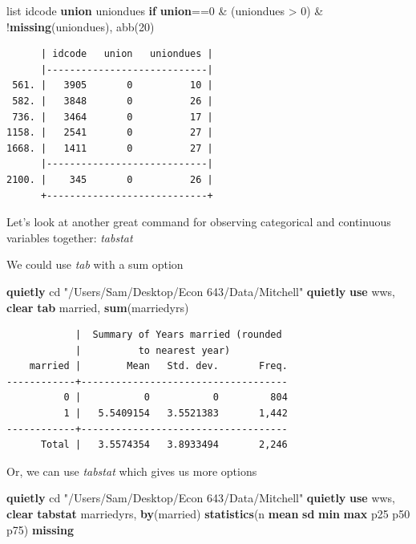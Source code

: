 \documentclass[
]{book}
\newenvironment{Shaded}{\begin{snugshade}}{\end{snugshade}}
\newcommand{\FunctionTok}[1]{\textcolor[rgb]{0.13,0.29,0.53}{\textbf{#1}}}
\newcommand{\KeywordTok}[1]{\textcolor[rgb]{0.13,0.29,0.53}{\textbf{#1}}}
\newcommand{\NormalTok}[1]{#1}
\newcommand{\OtherTok}[1]{\textcolor[rgb]{0.56,0.35,0.01}{#1}}
\newcommand{\StringTok}[1]{\textcolor[rgb]{0.31,0.60,0.02}{#1}}
\begin{document}
\begin{Shaded}
\begin{Highlighting}[]
\OtherTok{list}\NormalTok{ idcode }\KeywordTok{union}\NormalTok{ uniondues }\KeywordTok{if} \KeywordTok{union}\NormalTok{==0 \& (uniondues \textgreater{} 0) \& !}\FunctionTok{missing}\NormalTok{(uniondues), abb(20)}
\end{Highlighting}
\end{Shaded}

\begin{verbatim}
      | idcode   union   uniondues |
      |----------------------------|
 561. |   3905       0          10 |
 582. |   3848       0          26 |
 736. |   3464       0          17 |
1158. |   2541       0          27 |
1668. |   1411       0          27 |
      |----------------------------|
2100. |    345       0          26 |
      +----------------------------+
\end{verbatim}

Let's look at another great command for observing categorical and continuous
variables together: \emph{tabstat}

We could use \emph{tab} with a sum option

\begin{Shaded}
\begin{Highlighting}[]
\KeywordTok{quietly}\NormalTok{ cd }\StringTok{"/Users/Sam/Desktop/Econ 643/Data/Mitchell"}
\KeywordTok{quietly} \KeywordTok{use}\NormalTok{ wws, }\KeywordTok{clear}
\KeywordTok{tab}\NormalTok{ married, }\KeywordTok{sum}\NormalTok{(marriedyrs)}
\end{Highlighting}
\end{Shaded}

\begin{verbatim}
            |  Summary of Years married (rounded
            |          to nearest year)
    married |        Mean   Std. dev.       Freq.
------------+------------------------------------
          0 |           0           0         804
          1 |   5.5409154   3.5521383       1,442
------------+------------------------------------
      Total |   3.5574354   3.8933494       2,246
\end{verbatim}

Or, we can use \emph{tabstat} which gives us more options

\begin{Shaded}
\begin{Highlighting}[]
\KeywordTok{quietly}\NormalTok{ cd }\StringTok{"/Users/Sam/Desktop/Econ 643/Data/Mitchell"}
\KeywordTok{quietly} \KeywordTok{use}\NormalTok{ wws, }\KeywordTok{clear}
\KeywordTok{tabstat}\NormalTok{ marriedyrs, }\KeywordTok{by}\NormalTok{(married) }\KeywordTok{statistics}\NormalTok{(n }\KeywordTok{mean} \FunctionTok{sd} \FunctionTok{min} \FunctionTok{max}\NormalTok{ p25 p50 p75) }\FunctionTok{missing}
\end{Highlighting}
\end{Shaded}
\end{document}
